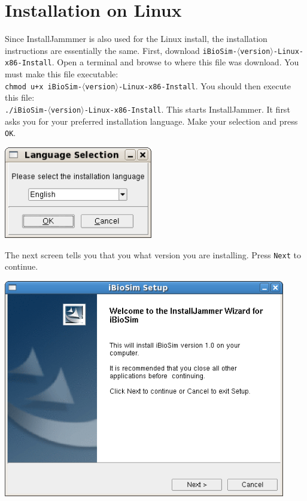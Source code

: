 \documentclass[titlepage,11pt]{article}
\begin{document}
\section{Installation on Linux}

\noindent
Since InstallJammmer is also used for the Linux install, the
installation instructions are essentially the same.
First, download {\tt iBioSim-$\langle$version$\rangle$-Linux-x86-Install}.
Open a terminal and browse to where this file was download.  You must
make this file executable:\\
{\tt chmod u+x iBioSim-$\langle$version$\rangle$-Linux-x86-Install}.
You should then execute this file:\\
{\tt ./iBioSim-$\langle$version$\rangle$-Linux-x86-Install}.
This starts InstallJammer.  It first asks you for your
preferred installation language.  Make your selection and press {\tt OK}.

\includegraphics[height=40mm]{screenshots/language}

\clearpage

The next screen tells you that you what version you are installing.
Press {\tt Next} to continue.

\includegraphics[height=95mm]{screenshots/setup}
\end{document}
